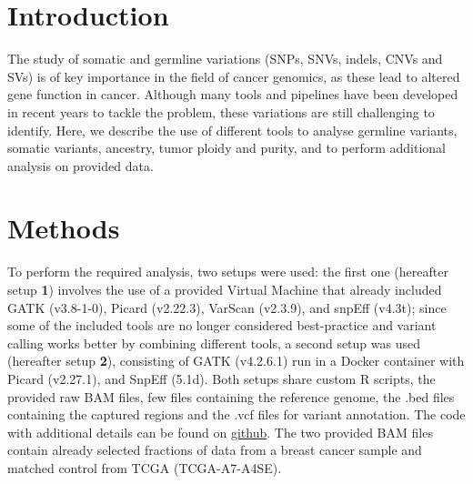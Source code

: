 \documentclass[11pt]{article}
\begin{document}







\section*{Introduction}

The study of somatic and germline variations (SNPs, SNVs, indels, CNVs and SVs) is of key importance in the field of cancer genomics, as these lead to altered gene function in cancer. Although many tools and pipelines have been developed in recent years to tackle the problem, these variations are still challenging to identify. Here, we describe the use of different tools to analyse germline variants, somatic variants, ancestry, tumor ploidy and purity, and to perform additional analysis on provided data. 




\section*{Methods}

To perform the required analysis, two setups were used: the first one (hereafter setup \textbf{1}) involves the use of a provided Virtual Machine that already included GATK (v3.8-1-0), Picard (v2.22.3), VarScan (v2.3.9), and snpEff (v4.3t); since some of the included tools are no longer considered best-practice and variant calling works better by combining different tools, a second setup was used (hereafter setup \textbf{2}), consisting of GATK (v4.2.6.1) run in a Docker container with Picard (v2.27.1), and SnpEff (5.1d). Both setups share custom R scripts, the provided raw BAM files, few files containing the reference genome, the .bed files containing the captured regions and the .vcf files for variant annotation. The code with additional details can be found on \href{https://github.com/enricofrigoli/chg_project.git}{github}. The two provided BAM files contain already selected fractions of data from a breast cancer sample and matched control from TCGA (TCGA-A7-A4SE).
\end{document}
